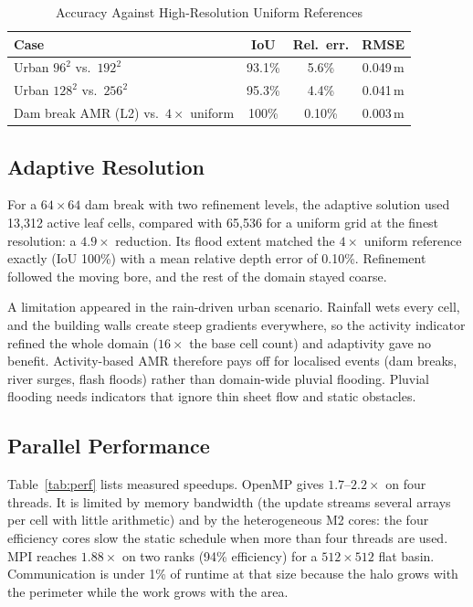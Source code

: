 \documentclass[conference]{IEEEtran}
\begin{document}
\begin{table}[t]
\caption{Accuracy Against High-Resolution Uniform References}
\label{tab:accuracy}
\centering
\begin{tabular}{@{}lccc@{}}
\toprule
Case & IoU & Rel.\ err. & RMSE \\
\midrule
Urban $96^2$ vs.\ $192^2$ & 93.1\% & 5.6\% & 0.049\,m \\
Urban $128^2$ vs.\ $256^2$ & 95.3\% & 4.4\% & 0.041\,m \\
Dam break AMR (L2) vs.\ $4\times$ uniform & 100\% & 0.10\% & 0.003\,m \\
\bottomrule
\end{tabular}
\end{table}

\subsection{Adaptive Resolution}
For a $64\times64$ dam break with two refinement levels, the adaptive solution
used 13{,}312 active leaf cells, compared with 65{,}536 for a uniform grid at
the finest resolution: a $4.9\times$ reduction. Its flood extent matched the
$4\times$ uniform reference exactly (IoU 100\%) with a mean relative depth
error of 0.10\%. Refinement followed the moving bore, and the rest of the
domain stayed coarse.

A limitation appeared in the rain-driven urban scenario. Rainfall wets every
cell, and the building walls create steep gradients everywhere, so the
activity indicator refined the whole domain ($16\times$ the base cell count)
and adaptivity gave no benefit. Activity-based AMR therefore pays off for
localised events (dam breaks, river surges, flash floods) rather than
domain-wide pluvial flooding. Pluvial flooding needs indicators that ignore
thin sheet flow and static obstacles.

\subsection{Parallel Performance}
Table~\ref{tab:perf} lists measured speedups. OpenMP gives
$1.7$--$2.2\times$ on four threads. It is limited by memory bandwidth (the
update streams several arrays per cell with little arithmetic) and by the
heterogeneous M2 cores: the four efficiency cores slow the static schedule when
more than four threads are used. MPI reaches $1.88\times$ on two ranks
(94\% efficiency) for a $512\times512$ flat basin. Communication is under 1\%
of runtime at that size because the halo grows with the perimeter while the
work grows with the area.
\end{document}
